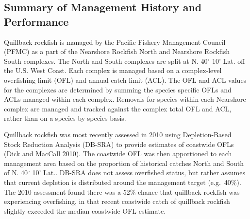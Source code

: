 \documentclass[11pt,
  english,
  a4paper,
]{article}
\begin{document}
\leavevmode\tagmcend\tagstructend\par


\hypertarget{summary-of-management-history-and-performance}{%
\subsection{Summary of Management History and Performance}\label{summary-of-management-history-and-performance}}

\leavevmode\tagmcend\tagstructend


Quillback rockfish is managed by the Pacific Fishery Management Council (PFMC) as a part of the Nearshore Rockfish North and Nearshore Rockfish South complexes. The North and South complexes are split at N. 40{\(^\circ\)\leavevmode\tagmcend\tagstructend} 10' Lat. off the U.S. West Coast. Each complex is managed based on a complex-level overfishing limit (OFL) and annual catch limit (ACL). The OFL and ACL values for the complexes are determined by summing the species specific OFLs and ACLs managed within each complex. Removals for species within each Nearshore complex are managed and tracked against the complex total OFL and ACL, rather than on a species by species basis.

\leavevmode\tagmcend\tagstructend\par


Quillback rockfish was most recently assessed in 2010 using Depletion-Based Stock Reduction Analysis (DB-SRA) to provide estimates of coastwide OFLs {(Dick and MacCall 2010)\leavevmode\tagmcend\tagstructend}. The coastwide OFL was then apportioned to each management area based on the proportion of historical catches North and South of N. 40{\(^\circ\)\leavevmode\tagmcend\tagstructend} 10' Lat.. DB-SRA does not assess overfished status, but rather assumes that current depletion is distributed around the management target (e.g.~40\%). The 2010 assessment found there was a 52\% chance that quillback rockfish was experiencing overfishing, in that recent coastwide catch of quillback rockfish slightly exceeded the median coastwide OFL estimate.
\end{document}

